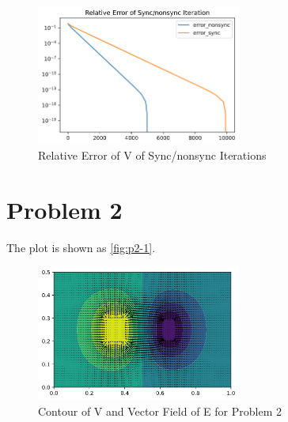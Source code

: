 \documentclass{article}
\begin{document}
        \begin{figure}[H]
            \centering
            \includegraphics[width=0.6\textwidth]{img/p1_4.png}
            \caption{Relative Error of V of Sync/nonsync Iterations}
            \label{fig:p1-4}
        \end{figure}

\section{Problem 2}

    The plot is shown as \autoref{fig:p2-1}.

    \begin{figure}[H]
        \centering
        \includegraphics[width=0.6\textwidth]{img/p2_1.png}
        \caption{Contour of V and Vector Field of E for Problem 2}
        \label{fig:p2-1}
    \end{figure}
\end{document}
